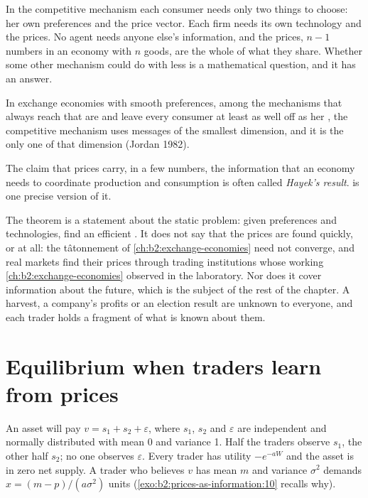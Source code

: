 In the competitive mechanism each consumer needs only two things to choose: her own preferences and the
price vector. Each firm needs its own technology and the prices. No agent needs anyone else's
information, and the prices, $n - 1$ numbers in an economy with $n$ goods, are the whole of what they share.
Whether some other mechanism could do with less is a mathematical question, and it has an answer.

\begin{theorem}\label{thm:b2:prices-as-information:minimal}
In exchange economies with smooth preferences, among the mechanisms that always reach  that
are  and leave every consumer at least as well off as her , the competitive
mechanism uses messages of the smallest dimension, and it is the only one of that dimension (Jordan
1982).
\end{theorem}

\admitted

\begin{remark}
The claim that prices carry, in a few numbers, the information that an economy needs to coordinate
production and consumption is often called \emph{Hayek's result}. 
is one precise version of it.
\end{remark}

The theorem is a statement about the static problem: given preferences and technologies, find an
efficient . It does not say that the prices are found quickly, or at all: the t\^atonnement of
\cref{ch:b2:exchange-economies} need not converge, and real markets find their prices through trading
institutions whose working \cref{ch:b2:exchange-economies} observed in the laboratory. Nor does it cover
information about the future, which is the subject of the rest of the chapter. A harvest, a company's
profits or an election result are unknown to everyone, and each trader holds a fragment of what is known
about them.

\section{Equilibrium when traders learn from prices}\label{sec:b2:prices-as-information:learning}

An asset will pay $v = s_1 + s_2 + \varepsilon$, where $s_1$, $s_2$ and $\varepsilon$ are independent and
normally distributed with mean 0 and variance 1. Half the traders observe $s_1$, the other half $s_2$; no
one observes $\varepsilon$. Every trader has utility $-e^{-aW}$ and the asset is in zero net supply. A
trader who believes $v$ has mean $m$ and variance $\sigma^2$ demands $x = (m - p)/(a\sigma^2)$ units
(\cref{exo:b2:prices-as-information:10} recalls why).

